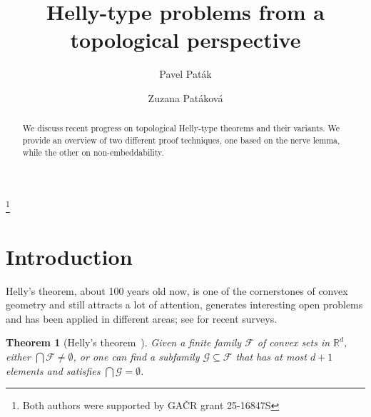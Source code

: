 \documentclass[a4paper,12pt]{amsart}
\newcommand{\R}{\mathbb{R}} 	%
\newtheorem{theorem}{Theorem}
\theoremstyle{definition}
\begin{document}
\title{Helly-type problems from a topological perspective}
\author[Pavel Paták]{Pavel Paták}
\author[Zuzana Patáková]{Zuzana Patáková}
\address[Pavel Paták]{Faculty of Information Technology, Czech Technical University in Prague, Thákurova 9, 160~00~Praha, Czech Republic}
\address{Department of Applied Mathematics, Faculty of Mathematics and Physics, Charles University, Malostranské náměstí 25, 118 00 Praha, Czech Republic}
\address[Zuzana Patáková]{Department of Algebra, Faculty of Mathematics and Physics, Charles University, Sokolovská~83, 186 75 Praha, Czech Republic}
\thanks{Both authors were supported by GA\v{C}R grant 25-16847S}

\begin{abstract}
 We discuss recent progress on topological Helly-type theorems and their variants. We provide an overview of two different proof techniques, one based on the nerve lemma, while the other on non-embeddability.
\end{abstract}

\maketitle



\section{Introduction}

Helly's theorem, about 100 years old now, is one of the cornerstones of convex geometry and still attracts a lot of attention, generates interesting open problems \cite{Barany_Kalai} and has been applied in different areas; see \cite{DeLorea_Goaoc_Meunier_Mustafa, amenta2016hellystheoremnewvariations} for recent surveys. 



\begin{theorem}[Helly's theorem~\cite{h-umkkm-23}]\label{thm:helly} Given a finite family $\mathcal F$ of convex sets in $\R^d$, either $\bigcap \mathcal F\neq \emptyset$, or one can find a subfamily $\mathcal G\subseteq \mathcal F$ that has at most $d+1$ elements and satisfies $\bigcap \mathcal G=\emptyset$.
\end{theorem}
\end{document}
